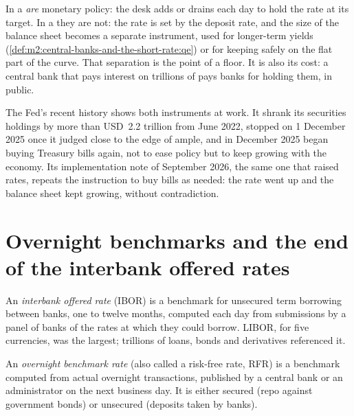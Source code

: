 In a   \emph{are} monetary policy: the
desk adds or drains  each day to hold the rate at its target. In a
 they are not: the rate is set by the deposit rate, and the size
of the balance sheet becomes a separate instrument, used for longer-term
yields (\cref{def:m2:central-banks-and-the-short-rate:qe}) or for keeping
 safely on the flat part of the curve. That separation is the point
of a floor. It is also its cost: a central bank that pays interest on
trillions of  pays banks for holding them, in public.

The Fed's recent history shows both instruments at work. It shrank its
securities holdings by more than USD~2.2 trillion from June 2022, stopped on
1 December 2025 once it judged  close to the edge of ample, and in
December 2025 began buying Treasury bills again, not to ease policy but to
keep  growing with the economy. Its implementation note of September
2026, the same one that raised rates, repeats the instruction to buy bills as
needed: the rate went up and the balance sheet kept growing, without
contradiction.

\section{Overnight benchmarks and the end of the interbank offered rates}

\begin{definition}\label{def:m2:central-banks-and-the-short-rate:ibor}
An \emph{interbank offered rate} (IBOR) is a
benchmark for unsecured term borrowing between banks, one to twelve months,
computed each day from submissions by a panel of banks of the rates at which
they could borrow. LIBOR, for five currencies, was the largest; trillions of
loans, bonds and derivatives referenced it.
\end{definition}

\begin{definition}\label{def:m2:central-banks-and-the-short-rate:rfr}
An \emph{overnight benchmark rate} (also
called a risk-free rate, RFR) is a benchmark computed from actual overnight
transactions, published by a central bank or an administrator on the next
business day. It is either secured (repo against government bonds) or
unsecured (deposits taken by banks).
\end{definition}

